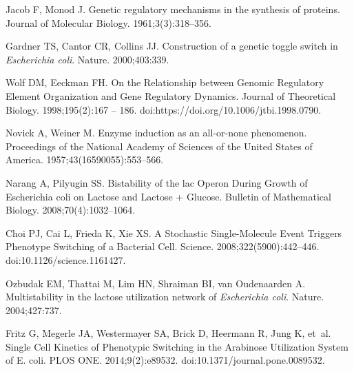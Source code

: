 \documentclass[10pt,letterpaper]{article}
\begin{document}
\nolinenumbers

%
%
 	
\begin{thebibliography}{10}
	
	Jacob F, Monod J.
	\newblock Genetic regulatory mechanisms in the synthesis of proteins.
	\newblock Journal of Molecular Biology. 1961;3(3):318--356.
	
	Gardner TS, Cantor CR, Collins JJ.
	\newblock Construction of a genetic toggle switch in \emph{Escherichia coli}.
	\newblock Nature. 2000;403:339.
	
	Wolf DM, Eeckman FH.
	\newblock On the Relationship between Genomic Regulatory Element Organization
	and Gene Regulatory Dynamics.
	\newblock Journal of Theoretical Biology. 1998;195(2):167 -- 186.
	\newblock doi:{https://doi.org/10.1006/jtbi.1998.0790}.
	
	Novick A, Weiner M.
	\newblock Enzyme induction as an all-or-none phenomenon.
	\newblock Proceedings of the National Academy of Sciences of the United States
	of America. 1957;43(16590055):553--566.
	
	Narang A, Pilyugin SS.
	\newblock Bistability of the lac Operon During Growth of Escherichia coli on
	Lactose and Lactose + Glucose.
	\newblock Bulletin of Mathematical Biology. 2008;70(4):1032--1064.
	
	Choi PJ, Cai L, Frieda K, Xie XS.
	\newblock A Stochastic Single-Molecule Event Triggers Phenotype Switching of a
	Bacterial Cell.
	\newblock Science. 2008;322(5900):442--446.
	\newblock doi:{10.1126/science.1161427}.
	
	Ozbudak EM, Thattai M, Lim HN, Shraiman BI, van Oudenaarden A.
	\newblock Multistability in the lactose utilization network of
	\emph{Escherichia coli}.
	\newblock Nature. 2004;427:737.
	
	Fritz G, Megerle JA, Westermayer SA, Brick D, Heermann R, Jung K, et~al.
	\newblock Single Cell Kinetics of Phenotypic Switching in the Arabinose
	Utilization System of E. coli.
	\newblock PLOS ONE. 2014;9(2):e89532.
	\newblock doi:{10.1371/journal.pone.0089532}.
	

\end{thebibliography}
\end{document}
